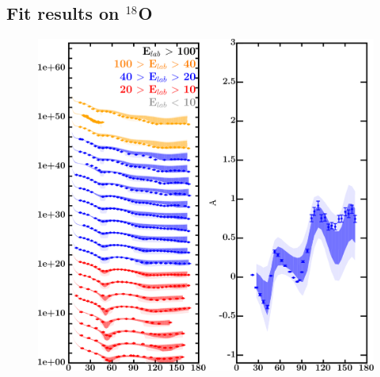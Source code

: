 \documentclass[twocolumn,secnumarabic,amssymb, nobibnotes, aps, prl,
superscriptaddress, nobalancelastpage]{revtex4}
\begin{document}
\subsection{Fit results on $^{18}$O}
\begin{figure}[!htb]
    \centering
    \begin{minipage}{0.45\textwidth}
        \centering
        \includegraphics[width=\textwidth]{figures/o18_protonElastic.png}
        \label{DOM_o18_proton_elastic}
    \end{minipage}\hspace{6pt}
    \begin{minipage}{0.45\textwidth}
        \centering

\end{minipage}
\end{figure}
\end{document}
